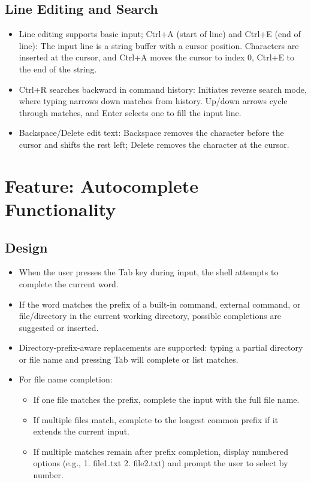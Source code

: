 \documentclass[11pt,a4paper]{article}
\begin{document}
\subsection{Line Editing and Search}
\begin{itemize}[leftmargin=*]
  \item Line editing supports basic input; Ctrl+A (start of line) and Ctrl+E (end of line): The input line is a string buffer with a cursor position. Characters are inserted at the cursor, and Ctrl+A moves the cursor to index 0, Ctrl+E to the end of the string.
  \item Ctrl+R searches backward in command history: Initiates reverse search mode, where typing narrows down matches from history. Up/down arrows cycle through matches, and Enter selects one to fill the input line.
  \item Backspace/Delete edit text: Backspace removes the character before the cursor and shifts the rest left; Delete removes the character at the cursor.
\end{itemize}

\section{Feature: Autocomplete Functionality}

\subsection{Design}
\begin{itemize}[leftmargin=*]
  \item When the user presses the Tab key during input, the shell attempts to complete the current word.
  \item If the word matches the prefix of a built-in command, external command, or file/directory in the current working directory, possible completions are suggested or inserted.
  \item Directory-prefix-aware replacements are supported: typing a partial directory or file name and pressing Tab will complete or list matches.
  \item For file name completion:
    \begin{itemize}
      \item If one file matches the prefix, complete the input with the full file name.
      \item If multiple files match, complete to the longest common prefix if it extends the current input.
      \item If multiple matches remain after prefix completion, display numbered options (e.g., 1. file1.txt 2. file2.txt) and prompt the user to select by number.
    \end{itemize}
\end{itemize}
\end{document}

